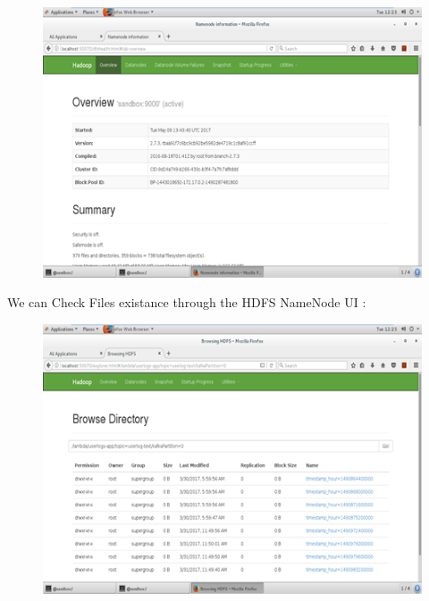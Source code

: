 \begin{figure}[h!]
	\centering
	\includegraphics[height=0.3\textheight]{fig01/HDFSNameNode}
	\label{fig:FilialesEtClients}
\end{figure}
\newpage
We can Check Files existance through the HDFS NameNode UI :
\begin{figure}[h!]
	\centering
	\includegraphics[height=0.5\textheight]{fig01/BrowserFilesHDFS}
	\label{fig:FilialesEtClients}
\end{figure}
